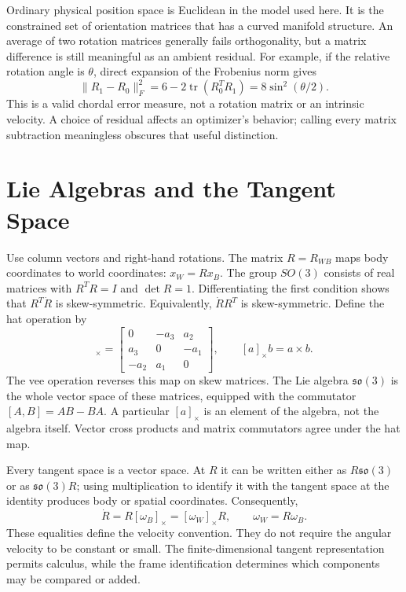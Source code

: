 Ordinary physical position space is Euclidean in the model used here. It is the constrained set of orientation matrices that has a curved manifold structure. An average of two rotation matrices generally fails orthogonality, but a matrix difference is still meaningful as an ambient residual. For example, if the relative rotation angle is $\theta$, direct expansion of the Frobenius norm gives
\begin{equation}
 \|R_1-R_0\|_F^2
 =6-2\operatorname{tr}(R_0^TR_1)
 =8\sin^2(\theta/2).
 \label{eq:rotation_chordal_cost}
\end{equation}
This is a valid chordal error measure, not a rotation matrix or an intrinsic velocity. A choice of residual affects an optimizer's behavior; calling every matrix subtraction meaningless obscures that useful distinction.

\section{Lie Algebras and the Tangent Space}
\label{sec:lie_algebras}

Use column vectors and right-hand rotations. The matrix $R=R_{WB}$ maps body coordinates to world coordinates: $x_W=Rx_B$. The group $SO(3)$ consists of real matrices with $R^TR=I$ and $\det R=1$. Differentiating the first condition shows that $R^T\dot R$ is skew-symmetric. Equivalently, $\dot RR^T$ is skew-symmetric. Define the hat operation by
\begin{equation}
 [a]_\times=
 \begin{bmatrix}0&-a_3&a_2\\a_3&0&-a_1\\-a_2&a_1&0\end{bmatrix},
 \qquad [a]_\times b=a\times b.
 \label{eq:exponential_hat}
\end{equation}
The vee operation reverses this map on skew matrices. The Lie algebra $\mathfrak{so}(3)$ is the whole vector space of these matrices, equipped with the commutator $[A,B]=AB-BA$. A particular $[a]_\times$ is an element of the algebra, not the algebra itself. Vector cross products and matrix commutators agree under the hat map.

Every tangent space is a vector space. At $R$ it can be written either as $R\mathfrak{so}(3)$ or as $\mathfrak{so}(3)R$; using multiplication to identify it with the tangent space at the identity produces body or spatial coordinates. Consequently,
\begin{equation}
 \dot R=R[\omega_B]_\times=[\omega_W]_\times R,
 \qquad \omega_W=R\omega_B.
 \label{eq:exponential_angular_frames}
\end{equation}
These equalities define the velocity convention. They do not require the angular velocity to be constant or small. The finite-dimensional tangent representation permits calculus, while the frame identification determines which components may be compared or added.

